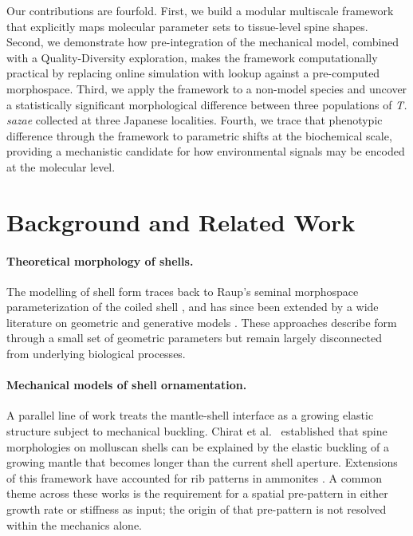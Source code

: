 Our contributions are fourfold. First, we build a modular multiscale framework that explicitly maps molecular parameter sets to tissue-level spine shapes. Second, we demonstrate how pre-integration of the mechanical model, combined with a Quality-Diversity exploration, makes the framework computationally practical by replacing online simulation with lookup against a pre-computed morphospace. Third, we apply the framework to a non-model species and uncover a statistically significant morphological difference between three populations of \textit{T. sazae} collected at three Japanese localities. Fourth, we trace that phenotypic difference through the framework to parametric shifts at the biochemical scale, providing a mechanistic candidate for how environmental signals may be encoded at the molecular level.

\section{Background and Related Work}

\paragraph{Theoretical morphology of shells.} The modelling of shell form traces back to Raup's seminal morphospace parameterization of the coiled shell \cite{raup1961geometric,raup1966geometric}, and has since been extended by a wide literature on geometric and generative models \cite{gerber2017geometry,urdy2011recapitulation,meinhardt1995algorithmic}. These approaches describe form through a small set of geometric parameters but remain largely disconnected from underlying biological processes.

\paragraph{Mechanical models of shell ornamentation.} A parallel line of work treats the mantle-shell interface as a growing elastic structure subject to mechanical buckling. Chirat et al.\ \cite{chirat2013mechanical} established that spine morphologies on molluscan shells can be explained by the elastic buckling of a growing mantle that becomes longer than the current shell aperture. Extensions of this framework have accounted for rib patterns in ammonites \cite{moulton2015morpho,erlich2016morphomechanics}. A common theme across these works is the requirement for a spatial pre-pattern in either growth rate or stiffness as input; the origin of that pre-pattern is not resolved within the mechanics alone.

